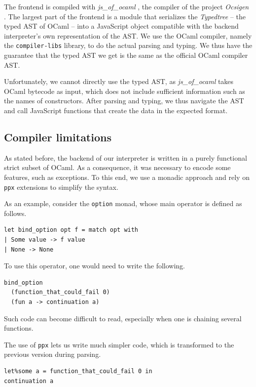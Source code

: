 \documentclass[twocolumn,a4paper]{article}
\begin{document}
The frontend is compiled with \emph{js\_of\_ocaml}
\cite{DBLP:journals/spe/VouillonB14}, the compiler of the project \emph{Ocsigen}
\cite{balat:hal-00691710}. The largest part of the frontend is a module that
serializes the \emph{Typedtree} -- the typed AST of OCaml -- into a JavaScript
object compatible with the backend interpreter's own representation of the AST.
We use the OCaml compiler, namely the \texttt{compiler-libs} library, to do the
actual parsing and typing. We thus have the guarantee that the typed AST we get
is the same as the official OCaml compiler AST.

Unfortunately, we cannot directly use the typed AST, as \emph{js\_of\_ocaml}
takes OCaml bytecode as input, which does not include sufficient information
such as the names of constructors. After parsing and typing, we thus navigate
the AST and call JavaScript functions that create the data in the expected format.

\subsection{Compiler limitations}

As stated before, the backend of our interpreter is written in a purely
functional strict subset of OCaml. As a consequence, it was necessary to encode
some features, such as exceptions. To this end, we use a monadic approach and
rely on \texttt{ppx} extensions to simplify the syntax.

As an example, consider the \texttt{option} monad, whose main operator is
defined as follows.

\begin{verbatim}
let bind_option opt f = match opt with
| Some value -> f value
| None -> None
\end{verbatim}

To use this operator, one would need to write the following.
\begin{verbatim}
bind_option
  (function_that_could_fail 0)
  (fun a -> continuation a)
\end{verbatim}
Such code can become difficult to read, especially when one is chaining several
functions.

The use of \texttt{ppx} lets us write much simpler code, which is transformed to
the previous version during parsing.
\begin{verbatim}
let%some a = function_that_could_fail 0 in
continuation a
\end{verbatim}
\end{document}
